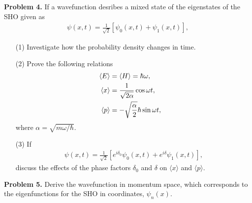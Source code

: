 \documentclass[floatfix,nofootinbib,superscriptaddress,fleqn]{revtex4-2}
\begin{document}
\vspace{1cm}

\noindent \textbf{Problem 4.}
If a wavefunction desribes a mixed state of the eigenstates of the SHO
given as 
\begin{align}
  \psi(x,t) = \frac1{\sqrt{2}}[\psi_0(x,t) + \psi_1(x,t)] ,
\end{align}
\begin{itemize}
\item[(1)] Investigate how the probability density changes in time. 
\item[(2)] Prove the following relations 
  \begin{align}
\langle E\rangle &= \langle H\rangle =\hbar \omega    ,\cr
\langle x \rangle &= \frac1{\sqrt{2\alpha}}\cos\omega t,\cr
\langle p \rangle &= -\sqrt{\frac{\alpha}{2}}\hbar \sin\omega t,
 \end{align}
where $\alpha = \sqrt{m\omega/\hbar}$.
 \item[(3)] If 
   \begin{align}
 \psi(x,t) = \frac1{\sqrt{2}}[e^{i\delta_0} \psi_0(x,t) + e^{i\delta}
     \psi_1(x,t)],     
   \end{align}
discuss the effects of the phase factors $\delta_0$ and $\delta$ on
$\langle x\rangle$ and $\langle p\rangle$.
\end{itemize}
 \vspace{1cm}

\noindent \textbf{Problem 5.}
Derive the wavefunction in momentum space, which corresponds to the
eigenfunctions for the SHO in coordinates, $\psi_n(x)$. 
\end{document}
